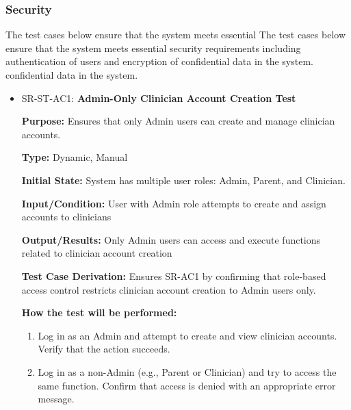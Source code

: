 \documentclass[12pt, titlepage]{article}
\begin{document}
\subsubsection{Security}

The test cases below ensure that the system meets essential 
The test cases below ensure that the system meets essential 
security requirements including authentication of users and encryption of 
confidential data in the system.
confidential data in the system.
		
\begin{itemize}

  \item SR-ST-AC1: \textbf{Admin-Only Clinician Account Creation Test}
  \begin{mdframed}[linewidth=0.5mm]
      \textbf{Purpose:} Ensures that only Admin users can create and manage clinician accounts. \par
      \textbf{Type:} Dynamic, Manual \par
      \textbf{Initial State:} System has multiple user roles: Admin, Parent, and Clinician. \par
      \textbf{Input/Condition:} User with Admin role attempts to create and assign accounts to clinicians \par
      \textbf{Output/Results:} Only Admin users can access and execute functions related 
      to clinician account creation \par
      \textbf{Test Case Derivation:} Ensures SR-AC1 by confirming that role-based access control restricts clinician account creation to Admin users only. \par
      \textbf{How the test will be performed:}
      \begin{enumerate}[noitemsep]
        \item Log in as an Admin and attempt to create and view clinician accounts. Verify that the action succeeds.
        \item Log in as a non-Admin (e.g., Parent or Clinician) and try to access the same function. Confirm that access is denied with an appropriate error message.
      \end{enumerate}
  \end{mdframed}


\end{itemize}
\end{document}
